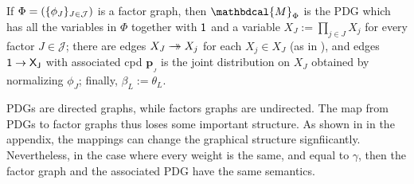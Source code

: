 \documentclass{article}
\theoremstyle{plain}
\newtheorem{prop}[theorem]{Proposition}
\theoremstyle{definition}
\theoremstyle{remark}
\newcommand\mat[1]{\mathbf{#1}}
\newcommand{\commentout}[1]{\ignorespaces}
\newcommand{\tto}{\rightarrow\mathrel{\mspace{-15mu}}\rightarrow}
\newcommand{\bp}[1][L]{\mat{p}_{\!_{#1}\!}}
\newcommand{\dg}[1]{\mathbdcal{#1}}
\newcommand{\PDGof}[1]{{\dg M}_{#1}}
\numberwithin{equation}{section}
\begin{document}
\begin{defn} \label{def:fg2PDG}
If $\Phi=(\{\phi_J\}_{J \in \cal J})$ is a factor graph, then 
$\PDGof{\Phi}$ is the PDG which has all the variables in $\Phi$
together with $\sf 1$ and a variable
$X_J := \prod_{j \in J} X_j$ for every factor $J \in \mathcal J$;
there are edges $X_J \tto X_j$ for each $X_j \in X_J$
(as in ), and edges $\sf 1 \to X_J$ with
associated cpd $\bp[J]$ is the joint distribution on $X_J$ obtained by
normalizing $\phi_J$; finally, $\beta_L := \theta_L$.
\end{defn}

PDGs are directed graphs, while factors graphs are undirected.  The
map from PDGs to factor graphs thus loses some important structure.
As shown in  in the appendix,
the mappings can change the graphical structure signfiicantly.
Nevertheless, in the case where every weight is the same, and equal to $\gamma$,
then the factor graph and the associated PDG have the same semantics.  

\commentout{
	\begin{prop}[restate=propfgpdglossless]%
		$\Phi \circ \PDGof = \mathrm{Id}_{\text{FG}}$. That is, if $F$ is a factor graph, then $\Pr_{\Phi(\PDGof{F})} = \Pr_F$.
	\end{prop}
}
\end{document}
